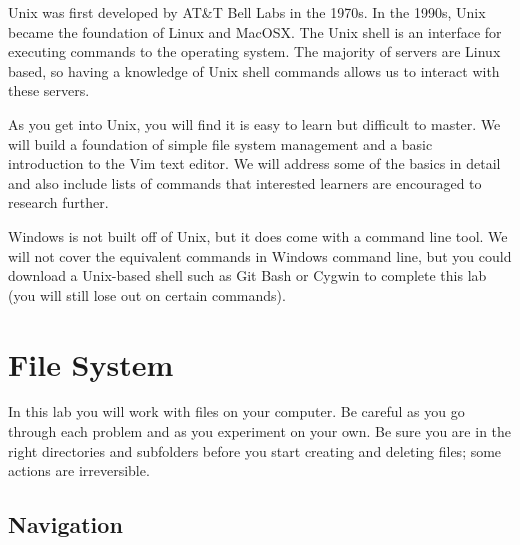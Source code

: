 \label{lab:Shell}


Unix was first developed by AT\&T Bell Labs in the 1970s. In the 1990s, Unix became the foundation of Linux and MacOSX.
The Unix shell is an interface for executing commands to the operating system.
The majority of servers are Linux based, so having a knowledge of Unix shell commands allows us to interact with these servers.

As you get into Unix, you will find it is easy to learn but difficult to master.
We will build a foundation of simple file system management and a basic introduction to the Vim text editor.
We will address some of the basics in detail and also include lists of commands that interested learners are encouraged to research further.

\begin{info} %
Windows is not built off of Unix, but it does come with a command line tool.
We will not cover the equivalent commands in Windows command line, but you could download a Unix-based shell such as Git Bash or Cygwin to complete this lab (you will still lose out on certain commands).
\end{info}

\section*{File System} %

\begin{warn}
In this lab you will work with files on your computer. Be careful as you go through each problem and as you experiment on your own.
Be sure you are in the right directories and subfolders before you start creating and deleting files; some actions are irreversible.
\end{warn}

\subsection*{Navigation} %

